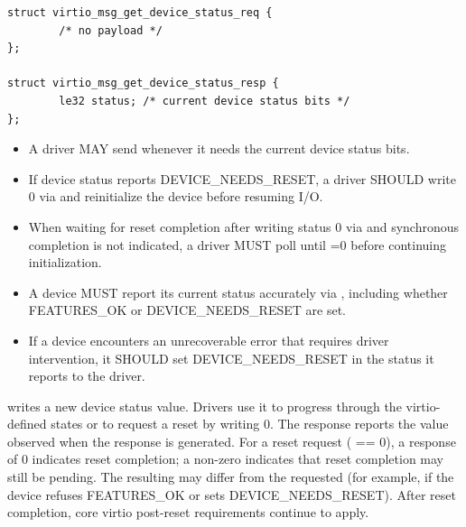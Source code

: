 \begin{lstlisting}
struct virtio_msg_get_device_status_req {
        /* no payload */
};

struct virtio_msg_get_device_status_resp {
        le32 status; /* current device status bits */
};
\end{lstlisting}

\begin{itemize}
  \item A driver MAY send  whenever it needs the
        current device status bits.
  \item If device status reports DEVICE\_NEEDS\_RESET, a driver SHOULD write 0
        via  and reinitialize the device before
        resuming I/O.
  \item When waiting for reset completion after writing status 0 via
         and synchronous completion is not indicated,
        a driver MUST poll  until
        =0 before continuing initialization.
\end{itemize}

\begin{itemize}
  \item A device MUST report its current status accurately via
        , including whether FEATURES\_OK or
        DEVICE\_NEEDS\_RESET are set.
  \item If a device encounters an unrecoverable error that requires driver
        intervention, it SHOULD set DEVICE\_NEEDS\_RESET in the status it
        reports to the driver.
\end{itemize}


 writes a new device status value. Drivers use it to
progress through the virtio-defined states or to request a reset by writing 0.
The response reports the  value observed when the response is
generated. For a reset request ( == 0), a response
 of 0 indicates reset completion; a non-zero 
indicates that reset completion may still be pending. The resulting
 may differ from the requested  (for example, if
the device refuses FEATURES\_OK or sets DEVICE\_NEEDS\_RESET). After reset
completion, core virtio post-reset requirements continue to apply.

